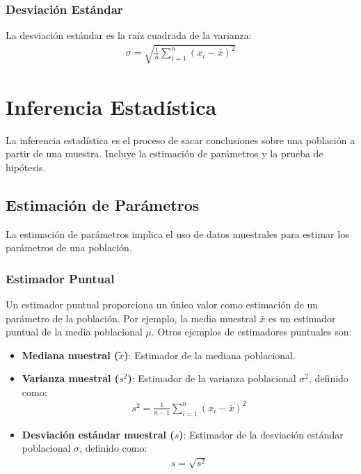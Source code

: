 \documentclass[a4paper]{report} %
\begin{document}
\subsubsection{Desviaci\'on Est\'andar}

La desviaci\'on est\'andar es la ra\'iz cuadrada de la varianza:
\begin{eqnarray*}
\sigma = \sqrt{\frac{1}{n} \sum_{i=1}^{n} (x_i - \bar{x})^2}
\end{eqnarray*}

\section{Inferencia Estad\'istica}

La inferencia estad\'istica es el proceso de sacar conclusiones sobre una poblaci\'on a partir de una muestra. Incluye la estimaci\'on de par\'ametros y la prueba de hip\'otesis.

\subsection{Estimaci\'on de Par\'ametros}

La estimaci\'on de par\'ametros implica el uso de datos muestrales para estimar los par\'ametros de una poblaci\'on.

\subsubsection{Estimador Puntual}

Un estimador puntual proporciona un \'unico valor como estimaci\'on de un par\'ametro de la poblaci\'on. Por ejemplo, la media muestral $\bar{x}$ es un estimador puntual de la media poblacional $\mu$. Otros ejemplos de estimadores puntuales son:

\begin{itemize}
    \item \textbf{Mediana muestral ($\tilde{x}$)}: Estimador de la mediana poblacional.
    \item \textbf{Varianza muestral ($s^2$)}: Estimador de la varianza poblacional $\sigma^2$, definido como:
    \begin{eqnarray*}
    s^2 = \frac{1}{n-1} \sum_{i=1}^{n} (x_i - \bar{x})^2
    \end{eqnarray*}
    \item \textbf{Desviaci\'on est\'andar muestral ($s$)}: Estimador de la desviaci\'on est\'andar poblacional $\sigma$, definido como:
    \begin{eqnarray*}
    s = \sqrt{s^2}
    \end{eqnarray*}
\end{itemize}
\end{document}
